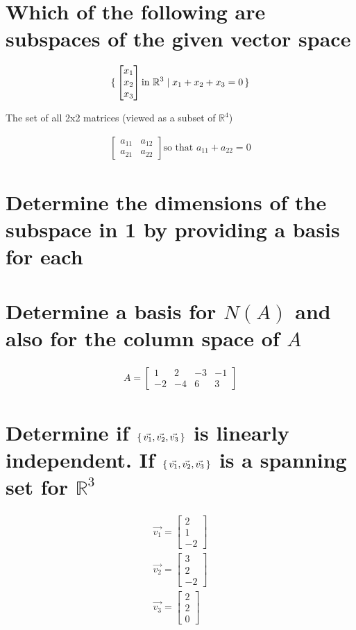 \documentclass{assignment}
\begin{document}
\section{Which of the following are subspaces of the given vector space}

\begin{align}
  \set{
  \begin{bmatrix}
    x_1 \\
    x_2 \\
    x_3
  \end{bmatrix}
  \mbox{in }
  \mathbb{R}^3
  \mid
  x_1 + x_2 + x_3 = 0}
\end{align}

The set of all 2x2 matrices (viewed as a subset of $\mathbb{R}^4$)

\begin{align}
  \begin{bmatrix}
    a_{11} & a_{12} \\
    a_{21} & a_{22}
  \end{bmatrix}
  \mbox{so that }
  a_{11} + a_{22} = 0
\end{align}

\newpage

\section{Determine the dimensions of the subspace in 1 by providing a basis for each}

\newpage

\section{Determine a basis for $N(A)$ and also for the column space of $A$}

\begin{align}
  A =
  \begin{bmatrix}
    1 & 2 & -3 & -1 \\
    -2 & -4 & 6 & 3
  \end{bmatrix}
\end{align}

\newpage

\section{Determine if $\set{\vec{v_1}, \vec{v_2}, \vec{v_3}}$ is linearly independent. If $\set{\vec{v_1}, \vec{v_2}, \vec{v_3}}$ is a spanning set for $\mathbb{R}^3$}

\begin{align}
  \vec{v_1} = \begin{bmatrix}
    2 \\
    1 \\
    -2
  \end{bmatrix} \\
  \vec{v_2} = \begin{bmatrix}
    3 \\
    2 \\
    -2
  \end{bmatrix} \\
  \vec{v_3} = \begin{bmatrix}
    2 \\
    2 \\
    0
  \end{bmatrix}
\end{align}
  
\end{document}
